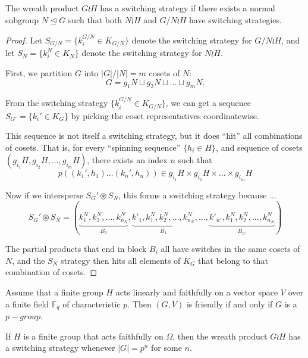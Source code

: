 \begin{theorem}
  The wreath product $G \wr H$ has a switching strategy if there exists a
  normal subgroup $N \trianglelefteq G$ such that both $N \wr H$ and
  $G/N \wr H$ have switching strategies.
\end{theorem}
\begin{proof}
  Let $S_{G/N} = \{k_i^{G/N} \in K_{G/N}\}$ denote the switching strategy for $G/N \wr H$, and
  let $S_{N} = \{k_i^N \in K_{N}\}$ denote the switching strategy for $N \wr H$.

  First, we partition $G$ into $|G|/|N| = m$ cosets of $N$: \[
    G = g_1N \sqcup g_2N \sqcup \dots \sqcup g_mN.
  \]

  From the switching strategy $\{k_i^{G/N} \in K_{G/N}\}$,
  we can get a sequence $S_{G'} = \{k_i' \in K_G\}$
  by picking the coset representatives coordinatewise.

  This sequence is not itself a switching strategy, but it does ``hit'' all
  combinations of cosets. That is, for every ``spinning sequence'' $\{h_i \in H\}$,
  and sequence of cosets $(g_{i_1}H, g_{i_2}H, \dots, g_{i_m}H)$, there exists
  an index $n$ such that \[
    p((k_1', h_1) \dots (k_n', h_n)) \in g_{i_1}H \times g_{i_2}H \times \dots \times g_{i_m}H
  \]

  Now if we intersperse $S_G' \circledast S_N$, this forms a
  switching strategy because ... \[
    S_G' \circledast S_N = (\underbrace{k^N_1, k^N_2, \dots, k^N_{n_N}}_{B_0}, \underbrace{k'_1, k^N_1, k^N_2, \dots, k^N_{n_N}}_{B_1}, \dots, \underbrace{k'_{n'}, k^N_1, k^N_2, \dots, k^N_{n_N}}_{B_{n'}})
  \]

  The partial products that end in block $B_i$ all have switches in the same
  cosets of $N$, and the $S_N$ strategy then hits all elements of $K_G$ that
  belong to that combination of cosets.

\end{proof}
\begin{theorem} \cite{Rabinovich2022}
  Assume that a finite group $H$ acts linearly and faithfully on a vector space
  $V$ over a finite field $\mathbb F_q$ of characteristic $p$.
  Then $(G, V)$ is friendly if and only if $G$ is a $p-group$.
\end{theorem}
\begin{corollary}
  If $H$ is a finite group that acts faithfully on $\Omega$, then the wreath product
  $G \wr H$ has a switching strategy whenever $|G| = p^n$ for some $n$.
\end{corollary}
